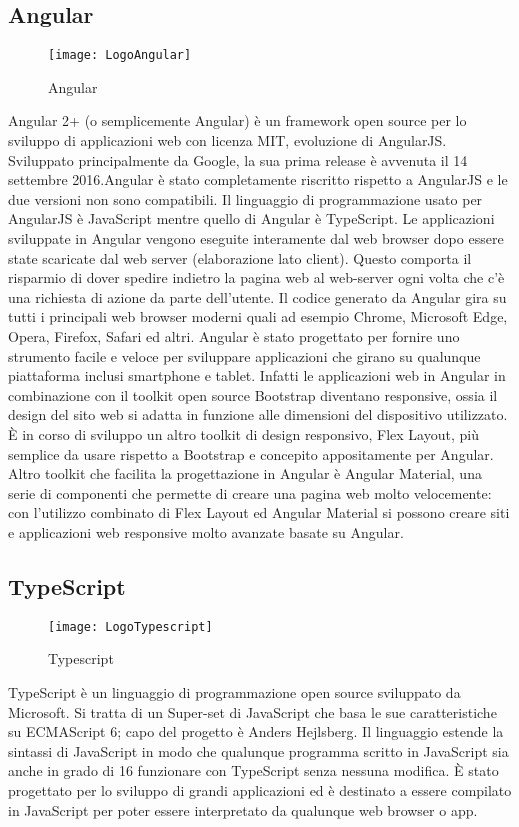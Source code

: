 \subsection{Angular}
\begin{figure}[htpb!]
\center
  \texttt{[image: LogoAngular]}
  \caption{Angular}
\end{figure}
Angular 2+\cite{ang} (o semplicemente Angular) è un framework open source per lo sviluppo di applicazioni web con licenza MIT, evoluzione di AngularJS. Sviluppato principalmente da Google, la sua prima release è avvenuta il 14 settembre 2016.Angular è stato completamente riscritto rispetto a AngularJS e le due versioni non sono compatibili. Il linguaggio di programmazione usato per AngularJS è JavaScript mentre quello di Angular è TypeScript. Le applicazioni sviluppate in Angular vengono eseguite interamente dal web browser dopo essere state scaricate dal web server (elaborazione lato client). Questo comporta il risparmio di dover spedire indietro la pagina web al web-server ogni volta che c'è una richiesta di azione da parte dell'utente. Il codice generato da Angular gira su tutti i principali web browser moderni quali ad esempio Chrome, Microsoft Edge, Opera, Firefox, Safari ed altri. Angular è stato progettato per fornire uno strumento facile e veloce per sviluppare applicazioni che girano su qualunque piattaforma inclusi smartphone e tablet. Infatti le applicazioni web in Angular in combinazione con il toolkit open source Bootstrap diventano responsive, ossia il design del sito web si adatta in funzione alle dimensioni del dispositivo utilizzato. È in corso di sviluppo un altro toolkit di design responsivo, Flex Layout, più semplice da usare rispetto a Bootstrap e concepito appositamente per Angular. Altro toolkit che facilita la progettazione in Angular è Angular Material, una serie di componenti che permette di creare una pagina web molto velocemente: con l'utilizzo combinato di Flex Layout ed Angular Material si possono creare siti e applicazioni web responsive molto avanzate basate su Angular.
\subsection{TypeScript}
\begin{figure}[htpb!]
\center
  \texttt{[image: LogoTypescript]}
  \caption{Typescript}
\end{figure}
TypeScript\cite{typ} è un linguaggio di programmazione open source sviluppato da Microsoft. Si tratta di un Super-set di JavaScript che basa le sue caratteristiche su ECMAScript 6; capo del progetto è Anders Hejlsberg. Il linguaggio estende la sintassi di JavaScript in modo che qualunque programma scritto in JavaScript sia anche in grado di
16
funzionare con TypeScript senza nessuna modifica. È stato progettato per lo sviluppo di grandi applicazioni ed è destinato a essere compilato in JavaScript per poter essere interpretato da qualunque web browser o app.

